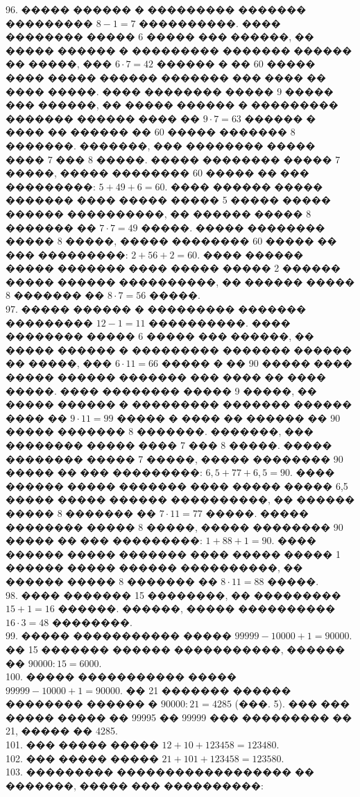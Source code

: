 \documentclass[12pt]{article}
\begin{document}
96. ����� ������ � ��������� ������� ��������� $8-1=7$ ����������. ���� �������� ����� 6 ����� ��� ������, �� ����� ������ � ��������� ������� ������ �� �����, ��� $6\cdot7=42$ ������ � �� 60 ����� ���� ����� ������ ������� ��� ���� �� ���� �����. ���� �������� ����� 9 ����� ��� ������, �� ����� ������ � ��������� ������� ������ ���� �� $9\cdot7=63$ ������ � ���� �� ������ �� 60 ����� ������� 8 �������. �������, ��� �������� ����� ���� 7 ��� 8 �����. ����� �������� ����� 7 �����, ����� �������� 60 ����� �� ��� ���������: $5+49+6=60.$ ���� ������ ����� ������� ���� ����� ����� 5 ����� ����� ������ ����������, �� ������ ����� 8 ������� �� $7\cdot7=49$ �����. ����� �������� ����� 8 �����, ����� �������� 60 ����� �� ��� ���������: $2+56+2=60.$ ���� ������ ����� ������� ���� ����� ����� 2 ������ ����� ������ ����������, �� ������ ����� 8 ������� �� $8\cdot7=56$ �����.\\
97. ����� ������ � ��������� ������� ��������� $12-1=11$ ����������. ���� �������� ����� 6 ����� ��� ������, �� ����� ������ � ��������� ������� ������ �� �����, ��� $6\cdot11=66$ ����� � �� 90 ����� ���� ����� ������ ������� ��� ���� �� ���� �����. ���� �������� ����� 9 �����, �� ����� ������ � ��������� ������� ������ ���� �� $9\cdot11=99$ ����� � ���� �� ������ �� 90 ����� ������� 8 �������. �������, ��� �������� ����� ���� 7 ��� 8 �����. ����� �������� ����� 7 �����, ����� �������� 90 ����� �� ��� ���������: $6,5+77+6,5=90.$ ���� ������ ����� ������� ���� ����� ����� 6,5 ����� ����� ������ ����������, �� ������ ����� 8 ������� �� $7\cdot11=77$ �����. ����� �������� ����� 8 �����, ����� �������� 90 ����� �� ��� ���������: $1+88+1=90.$ ���� ������ ����� ������� ���� ����� ����� 1 ������ ����� ������ ����������, �� ������ ����� 8 ������� �� $8\cdot11=88$ �����.\\
98. ���� ������� 15 ��������, �� ��������� $15+1=16$ ������. ������, ����� ���������� $16\cdot3=48$ ��������.\\
99. ����� ����������� ����� $99999-10000+1=90000.$ �� 15 ������� ������ �����������, ������ �� $90000:15=6000.$\\
100. ����� ����������� ����� $99999-10000+1=90000.$ �� 21 ������� ������ �������� ������ � $90000:21=4285$ (���. 5). ��� ��� ����� ����� �� 99995 �� 99999 ��� ��������� �� 21, ����� �� 4285.\\
101. ��� ����� ����� $12+10+123458=123480.$\\
102. ��� ����� ����� $21+101+123458=123580.$\\
103. ��������� ������������������ �� �������, ����� ��� ����������:
\end{document}
